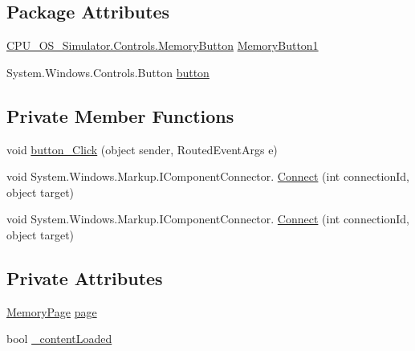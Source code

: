 \subsection*{Package Attributes}
\begin{DoxyCompactItemize}
\item 
\hyperlink{class_c_p_u___o_s___simulator_1_1_controls_1_1_memory_button}{C\+P\+U\+\_\+\+O\+S\+\_\+\+Simulator.\+Controls.\+Memory\+Button} \hyperlink{class_c_p_u___o_s___simulator_1_1_controls_1_1_memory_button_a2e7392666103d95911b5cd08e69c4d0a}{Memory\+Button1}
\item 
System.\+Windows.\+Controls.\+Button \hyperlink{class_c_p_u___o_s___simulator_1_1_controls_1_1_memory_button_a743f53bad6bbd6f478113dbf956ba408}{button}
\end{DoxyCompactItemize}
\subsection*{Private Member Functions}
\begin{DoxyCompactItemize}
\item 
void \hyperlink{class_c_p_u___o_s___simulator_1_1_controls_1_1_memory_button_a8cafbabcc5974c9705d3e9d193f4fcc4}{button\+\_\+\+Click} (object sender, Routed\+Event\+Args e)
\item 
void System.\+Windows.\+Markup.\+I\+Component\+Connector. \hyperlink{class_c_p_u___o_s___simulator_1_1_controls_1_1_memory_button_a70a4aaa5ada75d6a009a9685d84ef1c2}{Connect} (int connection\+Id, object target)
\item 
void System.\+Windows.\+Markup.\+I\+Component\+Connector. \hyperlink{class_c_p_u___o_s___simulator_1_1_controls_1_1_memory_button_a70a4aaa5ada75d6a009a9685d84ef1c2}{Connect} (int connection\+Id, object target)
\end{DoxyCompactItemize}
\subsection*{Private Attributes}
\begin{DoxyCompactItemize}
\item 
\hyperlink{class_c_p_u___o_s___simulator_1_1_memory_1_1_memory_page}{Memory\+Page} \hyperlink{class_c_p_u___o_s___simulator_1_1_controls_1_1_memory_button_a11e523d7bb59a28d303233a4198b1abe}{page}
\item 
bool \hyperlink{class_c_p_u___o_s___simulator_1_1_controls_1_1_memory_button_a4d343c3309d3567c4a0d215d3decccf6}{\+\_\+content\+Loaded}
\end{DoxyCompactItemize}


